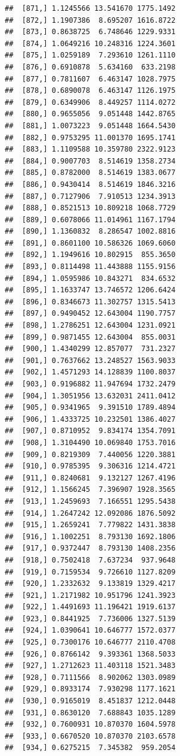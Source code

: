 \documentclass[article]{jss}\usepackage[]{graphicx}\usepackage[]{xcolor}
\makeatletter
\newenvironment{kframe}{%
 \def\at@end@of@kframe{}%
 \ifinner\ifhmode%
  \def\at@end@of@kframe{\end{minipage}}%
  \begin{minipage}{\columnwidth}%
 \fi\fi%
 \def\FrameCommand##1{\hskip\@totalleftmargin \hskip-\fboxsep
 \colorbox{shadecolor}{##1}\hskip-\fboxsep
     \hskip-\linewidth \hskip-\@totalleftmargin \hskip\columnwidth}%
 \MakeFramed {\advance\hsize-\width
   \@totalleftmargin\z@ \linewidth\hsize
   \@setminipage}}%
 {\par\unskip\endMakeFramed%
 \at@end@of@kframe}
\newenvironment{knitrout}{}{} %
\makeatother
\begin{document}
\begin{knitrout}
\begin{kframe}
\begin{verbatim}
##  [871,] 1.1245566 13.541670 1775.1492
##  [872,] 1.1907386  8.695207 1616.8722
##  [873,] 0.8638725  6.748646 1229.9331
##  [874,] 1.0649216 10.248316 1224.3601
##  [875,] 1.0259189  7.293610 1261.1110
##  [876,] 0.6910878  5.634160  633.2198
##  [877,] 0.7811607  6.463147 1028.7975
##  [878,] 0.6890078  6.463147 1126.1975
##  [879,] 0.6349906  8.449257 1114.0272
##  [880,] 0.9655056  9.051448 1442.8765
##  [881,] 1.0073223  9.051448 1664.5430
##  [882,] 0.9753295 11.001370 1695.1741
##  [883,] 1.1109588 10.359780 2322.9123
##  [884,] 0.9007703  8.514619 1358.2734
##  [885,] 0.8782000  8.514619 1383.0677
##  [886,] 0.9430414  8.514619 1846.3216
##  [887,] 0.7127906  7.910513 1234.3913
##  [888,] 0.8521513 10.809218 1068.7729
##  [889,] 0.6078066 11.014961 1167.1794
##  [890,] 1.1360832  8.286547 1002.8816
##  [891,] 0.8601100 10.586326 1069.6060
##  [892,] 1.1949616 10.802915  855.3650
##  [893,] 0.8114498 11.443888 1155.9156
##  [894,] 1.0595986 10.843271  834.6532
##  [895,] 1.1633747 13.746572 1206.6424
##  [896,] 0.8346673 11.302757 1315.5413
##  [897,] 0.9490452 12.643004 1190.7757
##  [898,] 1.2786251 12.643004 1231.0921
##  [899,] 0.9871455 12.643004  855.0031
##  [900,] 1.4340299 12.857077  731.2327
##  [901,] 0.7637662 13.248527 1563.9033
##  [902,] 1.4571293 14.128839 1100.8037
##  [903,] 0.9196882 11.947694 1732.2479
##  [904,] 1.3051956 13.632031 2411.0412
##  [905,] 0.9341965  9.391510 1789.4894
##  [906,] 1.4333725 10.232501 1386.4027
##  [907,] 0.8710952  9.834174 1354.7091
##  [908,] 1.3104490 10.069840 1753.7016
##  [909,] 0.8219309  7.440056 1220.3881
##  [910,] 0.9785395  9.306316 1214.4721
##  [911,] 0.8240681  9.132127 1267.4196
##  [912,] 1.1566245  7.396907 1928.3565
##  [913,] 1.2459693  7.166551 1295.5438
##  [914,] 1.2647242 12.092086 1876.5092
##  [915,] 1.2659241  7.779822 1431.3838
##  [916,] 1.1002251  8.793130 1692.1806
##  [917,] 0.9372447  8.793130 1408.2356
##  [918,] 0.7502418  7.637234  937.9648
##  [919,] 0.7159534  9.726610 1127.8209
##  [920,] 1.2332632  9.133819 1329.4217
##  [921,] 1.2171982 10.951796 1241.3923
##  [922,] 1.4491693 11.196421 1919.6137
##  [923,] 0.8441925  7.736006 1327.5139
##  [924,] 1.0390641 10.646777 1572.0377
##  [925,] 0.7300176 10.646777 2110.4708
##  [926,] 0.8766142  9.393361 1368.5033
##  [927,] 1.2712623 11.403118 1521.3483
##  [928,] 0.7111566  8.902062 1303.0989
##  [929,] 0.8933174  7.930298 1177.1621
##  [930,] 0.9165019  8.451837 1212.0448
##  [931,] 0.8630120  7.688843 1035.1289
##  [932,] 0.7600931 10.870370 1604.5978
##  [933,] 0.6670520 10.870370 2103.6578
##  [934,] 0.6275215  7.345382  959.2054

\end{verbatim}
\end{kframe}
\end{knitrout}
\end{document}
